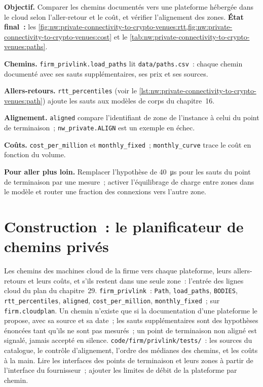 \begin{tutorial}
\textbf{Objectif.} Comparer les chemins documentés vers une plateforme hébergée dans le cloud selon l'aller-retour et le coût, et vérifier l'alignement des zones.
\textbf{État final~:} les \cref{fig:nw:private-connectivity-to-crypto-venues:rtt,fig:nw:private-connectivity-to-crypto-venues:cost} et
le \cref{tab:nw:private-connectivity-to-crypto-venues:paths}.
\begin{tutsteps}
\item \textbf{Chemins.} \texttt{firm\_privlink.load\_paths} lit \texttt{data/paths.csv}~: chaque chemin documenté avec ses sauts supplémentaires, ses prix et ses
  sources.
\item \textbf{Allers-retours.} \texttt{rtt\_percentiles} (voir le \cref{lst:nw:private-connectivity-to-crypto-venues:path}) ajoute les sauts aux modèles
  de corps du chapitre~16.
\item \textbf{Alignement.} \texttt{aligned} compare l'identifiant de zone de l'instance à celui du point de terminaison~; \texttt{nw\_private.ALIGN} est un exemple en échec.
\item \textbf{Coûts.} \texttt{cost\_per\_million} et \texttt{monthly\_fixed}~; \texttt{monthly\_curve} trace le coût en fonction du volume.
\end{tutsteps}
\textbf{Pour aller plus loin.} Remplacer l'hypothèse de \qty{40}{\micro\second} pour les sauts du point de terminaison par une mesure~; activer l'équilibrage de charge entre zones dans le
  modèle et router une fraction des connexions vers l'autre zone.
\end{tutorial}

\section{Construction~: le planificateur de chemins privés}\label{bld:nw:private-connectivity-to-crypto-venues:privlink}

\begin{build}
 Les chemins des machines cloud de la firme vers chaque plateforme, leurs allers-retours et leurs coûts, et s'ils restent dans une seule zone~: l'entrée des
  lignes cloud du plan du chapitre~29.
 \texttt{firm\_privlink}~: \texttt{Path}, \texttt{load\_paths}, \texttt{BODIES}, \texttt{rtt\_percentiles}, \texttt{aligned},
\texttt{cost\_per\_million}, \texttt{monthly\_fixed}~; sur \texttt{firm.cloudplan}.
 Un chemin n'existe que si la documentation d'une plateforme le propose, avec sa source et sa date~; les sauts supplémentaires sont des hypothèses énoncées tant qu'ils ne sont pas mesurés~; un
point de terminaison non aligné est signalé, jamais accepté en silence.
 \texttt{code/firm/privlink/tests/}~: les sources du catalogue, le contrôle d'alignement, l'ordre des médianes des chemins, et les
coûts à la main.
 Lire les interfaces des points de terminaison et leurs zones à partir de l'interface du fournisseur~; ajouter les limites de débit de la plateforme par chemin.
\end{build}

